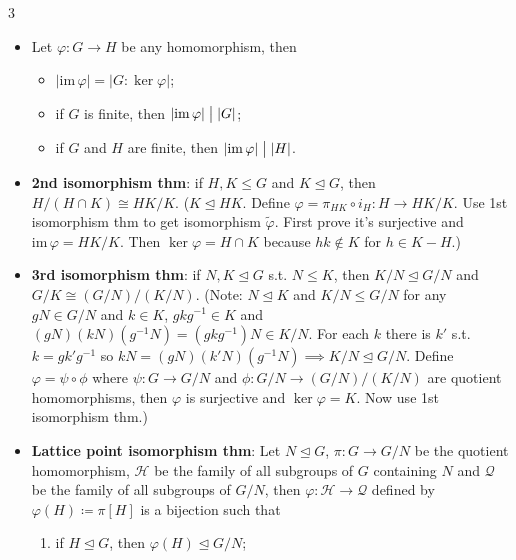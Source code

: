\documentclass[10pt]{article}
\newcommand{\abs}[1]{\left\lvert#1\right\rvert} %
\begin{document}
\begin{multicols*}{3}
\begin{itemize}
            \item Let $\varphi \colon G \to H$ be any homomorphism, then 
            \begin{itemize}
                \item $\abs{\mathrm{im}\,{\varphi}} = \abs{G \colon \ker{\varphi}}$;
                \item if $G$ is finite, then $\abs{\mathrm{im}\,{\varphi}} \bigm\vert \abs{G}$;
                \item if $G$ and $H$ are finite, then $\abs{\mathrm{im}\,{\varphi}} \bigm\vert \abs{H}$.
            \end{itemize}
            \item \textbf{2nd isomorphism thm}: if $H, K \leq G$ and $K \trianglelefteq G$, then $H \slash \left(H \cap K\right) \cong HK \slash K$. ($K \trianglelefteq HK$. Define $\varphi = \pi_{HK} \circ i_H \colon H \to HK \slash K$. Use 1st isomorphism thm to get isomorphism $\tilde{\varphi}$. First prove it's surjective and $\mathrm{im}\,\varphi = HK \slash K$. Then $\ker{\varphi} = H\cap K$ because $hk \notin K$ for $h \in K - H$.)
            \item \textbf{3rd isomorphism thm}: if $N, K \trianglelefteq G$ s.t. $N \leq K$, then $K \slash N \trianglelefteq G \slash N$ and $G \slash K \cong \left(G \slash N\right) \slash \left(K \slash N\right)$. (Note: $N \trianglelefteq K$ and $K \slash N \leq G \slash N$ for any $gN \in G \slash N$ and $k \in K$, $gkg^{-1} \in K$ and $\left(gN\right)\left(kN\right)\left(g^{-1}N\right) = \left(gkg^{-1}\right)N \in K \slash N$. For each $k$ there is $k'$ s.t. $k = gk'g^{-1}$ so $kN = \left(gN\right)\left(k'N\right)\left(g^{-1}N\right) \implies K \slash N \trianglelefteq G \slash N$. Define $\varphi = \psi \circ \phi$ where $\psi \colon G \to G \slash N$ and $\phi \colon G \slash N \to \left(G \slash N\right) \slash \left(K \slash N\right)$ are quotient homomorphisms, then $\varphi$ is surjective and $\ker{\varphi} = K$. Now use 1st isomorphism thm.)
            \item \textbf{Lattice point isomorphism thm}: Let $N \trianglelefteq G$, $\pi \colon G \to G \slash N$ be the quotient homomorphism, $\mathcal{H}$ be the family of all subgroups of $G$ containing $N$ and $\mathcal{Q}$ be the family of all subgroups of $G \slash N$, then $\varphi \colon \mathcal{H} \to \mathcal{Q}$ defined by $\varphi\left(H\right) \coloneqq \pi\left[H\right]$ is a bijection such that 
            \begin{enumerate}
                \item if $H \trianglelefteq G$, then $\varphi\left(H\right) \trianglelefteq G \slash N$;

\end{enumerate}
\end{itemize}
\end{multicols*}
\end{document}
